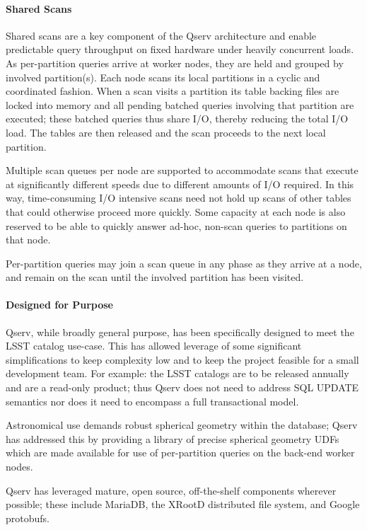 \documentclass[11pt,twoside]{article}
\begin{document}
\paragraph{Shared Scans}

Shared scans are a key component of the Qserv architecture and enable predictable query throughput on fixed
hardware under heavily concurrent loads.  As per-partition queries arrive at worker nodes, they are held and
grouped by involved partition(s).  Each node scans its local partitions in a cyclic and coordinated fashion.
When a scan visits a partition its table backing files are locked into memory and all pending batched queries
involving that partition are executed; these batched queries thus share I/O, thereby reducing the total I/O
load. The tables are then released and the scan proceeds to the next local partition.

Multiple scan queues per node are supported to accommodate scans that execute at significantly different
speeds due to different amounts of I/O required.  In this way, time-consuming I/O intensive scans need not
hold up scans of other tables that could otherwise proceed more quickly.  Some capacity at each node is also
reserved to be able to quickly answer ad-hoc, non-scan queries to partitions on that node.

Per-partition queries may join a scan queue in any phase as they arrive at a node, and remain on the scan
until the involved partition has been visited.

\paragraph{Designed for Purpose}

Qserv, while broadly general purpose, has been specifically designed to meet the LSST catalog use-case. This
has allowed leverage of some significant simplifications to keep complexity low and to keep the project
feasible for a small development team.  For example: the LSST catalogs are to be released annually and are a
read-only product; thus Qserv does not need to address SQL UPDATE semantics nor does it need to encompass a
full transactional model.

Astronomical use demands robust spherical geometry within the database; Qserv has addressed this by providing
a library of precise spherical geometry UDFs which are made available for use of per-partition queries on the
back-end worker nodes.

Qserv has leveraged mature, open source, off-the-shelf components wherever possible; these include MariaDB,
the XRootD distributed file system, and Google protobufs.
\end{document}
